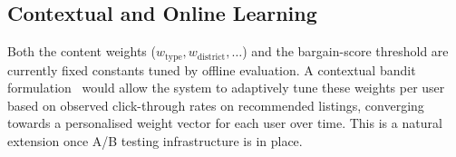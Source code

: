 \subsection{Contextual and Online Learning}

Both the content weights ($w_{\text{type}}, w_{\text{district}}, \ldots$) and the
bargain-score threshold are currently fixed constants tuned by offline evaluation.
A contextual bandit formulation~\cite{li2010contextual} would allow the system to
adaptively tune these weights per user based on observed click-through rates on
recommended listings, converging towards a personalised weight vector for each user
over time. This is a natural extension once A/B testing infrastructure is in place.
